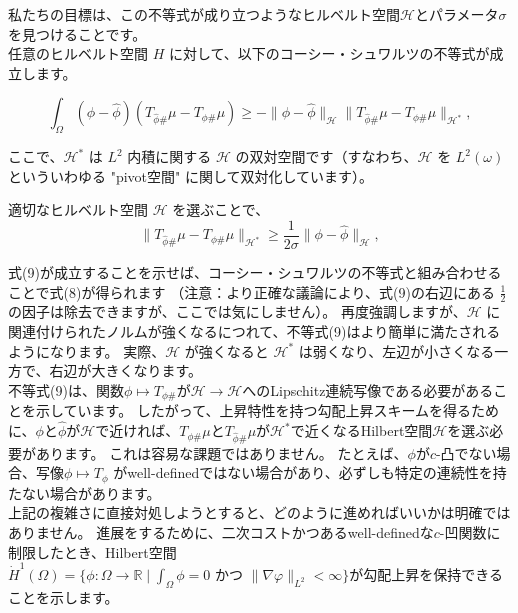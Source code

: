 \documentclass{jsarticle}
\theoremstyle{definition}
\begin{document}
\color{black}

私たちの目標は、この不等式が成り立つようなヒルベルト空間$\mathcal{H}$とパラメータ$\sigma$を見つけることです。\\

任意のヒルベルト空間 $H$ に対して、以下のコーシー・シュワルツの不等式が成立します。

\begin{equation*}
  \int_\Omega (\phi - \hat{\phi})(T_{\hat{\phi} \#} \mu - T_{\phi \#} \mu) \geq - \|\phi - \hat{\phi}\|_{\mathcal{H}} \|T_{\hat{\phi} \#} \mu - T_{\phi \#} \mu\|_{\mathcal{H}^*},
\end{equation*}

ここで、$\mathcal{H}^*$ は $L^2$ 内積に関する $\mathcal{H}$  の双対空間です（すなわち、$\mathcal{H}$  を $L^2(\omega)$ といういわゆる "pivot空間" に関して双対化しています）。


適切なヒルベルト空間 $\mathcal{H}$ を選ぶことで、
\begin{equation}
  \|T_{\hat{\phi} \#} \mu - T_{\phi \#} \mu\|_{\mathcal{H}^*} \geq \frac{1}{2 \sigma} \|\phi - \hat{\phi}\|_\mathcal{H} ,
\end{equation}

式(9)が成立することを示せば、コーシー・シュワルツの不等式と組み合わせることで式(8)が得られます
（注意：より正確な議論により、式(9)の右辺にある $\frac{1}{2}$ の因子は除去できますが、ここでは気にしません）。
再度強調しますが、$\mathcal{H}$ に関連付けられたノルムが強くなるにつれて、不等式(9)はより簡単に満たされるようになります。
実際、$\mathcal{H}$ が強くなると $\mathcal{H}^*$ は弱くなり、左辺が小さくなる一方で、右辺が大きくなります。\\
{\color{teal}
不等式(9)は、関数$\phi \mapsto T_{\phi \#}$が$\mathcal{H} \to \mathcal{H}$へのLipschitz連続写像である必要があることを示しています。
}
したがって、上昇特性を持つ勾配上昇スキームを得るために、$\phi$と$\hat{\phi}$が$\mathcal{H}$で近ければ、$T_{\phi \#} \mu$と$T_{\hat{\phi} \#} \mu$が$\mathcal{H}^*$で近くなるHilbert空間$\mathcal{H}$を選ぶ必要があります。
これは容易な課題ではありません。
たとえば、$\phi$が$c$-凸でない場合、写像$\phi \mapsto T_\phi$ がwell-definedではない場合があり、必ずしも特定の連続性を持たない場合があります。\\


上記の複雑さに直接対処しようとすると、どのように進めればいいかは明確ではありません。
進展をするために、二次コストかつあるwell-definedな$c$-凹関数に制限したとき、Hilbert空間$\dot{H}^1(\Omega)=\{\phi:\Omega\to\mathbb{R} \mid \int_\Omega \phi = 0 \text{ かつ } \|\nabla \varphi\|_{L^2}<\infty\}$が勾配上昇を保持できることを示します。
\end{document}
